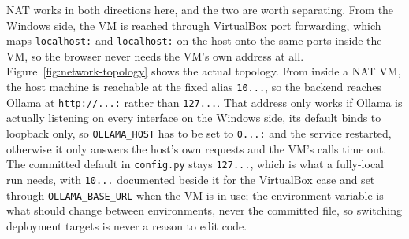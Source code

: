 NAT works in both directions here, and the two are worth separating. From the Windows side, the VM is reached through VirtualBox port forwarding, which maps \texttt{localhost:} and \texttt{localhost:} on the host onto the same ports inside the VM, so the browser never needs the VM's own address at all.
Figure~\ref{fig:network-topology} shows the actual topology. From inside a NAT VM, the host machine is reachable at the fixed alias \texttt{10...}, so the backend reaches Ollama at \texttt{http:\allowbreak /\allowbreak /...:} rather than \texttt{127...}. That address only works if Ollama is actually listening on every interface on the Windows side, its default binds to loopback only, so \texttt{OLLAMA\_\allowbreak HOST} has to be set to \texttt{0...:} and the service restarted, otherwise it only answers the host's own requests and the VM's calls time out. The committed default in \texttt{config.\allowbreak py} stays \texttt{127...}, which is what a fully-local run needs, with \texttt{10...} documented beside it for the VirtualBox case and set through \texttt{OLLAMA\_\allowbreak BASE\_\allowbreak URL} when the VM is in use; the environment variable is what should change between environments, never the committed file, so switching deployment targets is never a reason to edit code.

